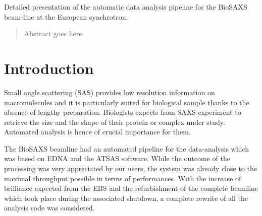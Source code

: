 \documentclass[preprint]{iucr}              %
\begin{document}

\maketitle                        %

\begin{synopsis}
Detailed presentation of the automatic data analysis pipeline for the BioSAXS beam-line at the European synchrotron.  
\end{synopsis}

\begin{abstract}
Abstract goes here.
\end{abstract}



\section{Introduction}
Small angle scattering (SAS) provides low resolution information on macromolecules and it is  
particularly suited for biological sample thanks to the absence of lengthy preparation. 
Biologists expects from SAXS experiment to retrieve the size and the shape of their protein or complex under study.
Automated analysis is hence of crucial importance for them.

The BioSAXS\cite{BM29paper} beamline had an automated pipeline for the data-analysis which was based on EDNA\cite{EDNA} and the ATSAS\cite{ATSAS}
software. 
While the outcome of the processing was very appreciated by our users, the system was already close to the maximal throughput possible in terms of performances. 
With the increase of brilliance expected from the EBS\cite{EBS} and the refurbishment of the complete beamline which took place during the associated shutdown, 
a complete rewrite of all the analysis code was considered.
\end{document}
